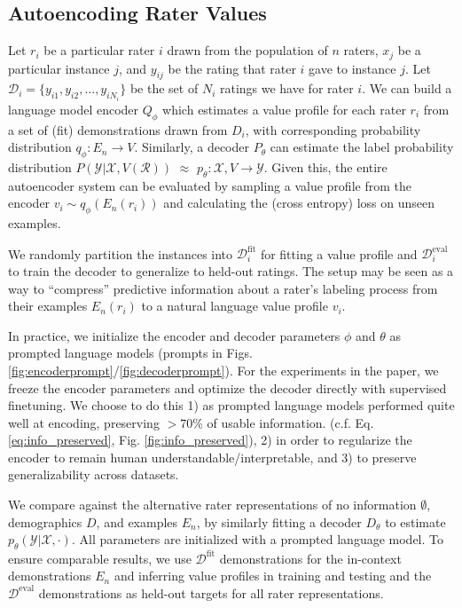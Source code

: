 \documentclass[11pt]{article}
\begin{document}
\subsection{Autoencoding Rater Values}
\label{sec:autoencoder}

Let $r_i$ be a particular rater $i$ drawn from the population of $n$ raters, $x_j$ be a particular instance $j$, and $y_{ij}$ be the rating that rater $i$ gave to instance $j$. Let $\mathcal{D}_i = \{y_{i1}, y_{i2}, \ldots, y_{iN_i}\}$ be the set of $N_i$ ratings we have for rater $i$. We can build a language model encoder $Q_\phi$ which estimates a value profile for each rater $r_i$ from a set of (fit) demonstrations drawn from $D_i$, with corresponding probability distribution $q_\phi: E_n \to V$. Similarly, a decoder $P_\theta$ can estimate the label probability distribution $P(\mathcal{Y}|\mathcal{X},V(\mathcal{R}))$ $\approx$ $p_\theta: \mathcal{X}, V \to \mathcal{Y}$. Given this, the entire autoencoder system can be evaluated by sampling a value profile from the encoder $v_i \sim q_\phi(E_n(r_i))$ and calculating the (cross entropy) loss on unseen examples.

We randomly partition the instances into $\mathcal{D}_i^{\text{fit}}$ for fitting a value profile and $\mathcal{D}_i^{\text{eval}}$
to train the decoder to generalize to held-out ratings. The setup may be seen as a way to ``compress'' predictive information about a rater's labeling process from their examples $E_n(r_i)$ to a natural language value profile $v_i$.


In practice, we initialize the encoder and decoder parameters $\phi$ and $\theta$ as prompted language models (prompts in Figs. \ref{fig:encoderprompt}/\ref{fig:decoderprompt}). For the experiments in the paper, we freeze the encoder parameters and optimize the decoder directly with supervised finetuning. We choose to do this 1) as prompted language models performed quite well at encoding, preserving $>70$\% of usable information. (c.f. Eq. \ref{eq:info_preserved}, Fig. \ref{fig:info_preserved}), 2) in order to regularize the encoder to remain human understandable/interpretable, and 3) to preserve generalizability across datasets.

We compare against the alternative rater representations of no information $\emptyset$, demographics $D$, and examples $E_n$, by similarly fitting a decoder $D_\theta$ to estimate  $p_\theta(\mathcal{Y}|\mathcal{X}, \cdot)$. All parameters are initialized with a prompted language model. To ensure comparable results, we use $\mathcal{D}^{\textrm{fit}}$ demonstrations for the in-context demonstrations $E_n$ and inferring value profiles in training and testing and the $\mathcal{D}^\textrm{eval}$ demonstrations as held-out targets for all rater representations.
\end{document}
